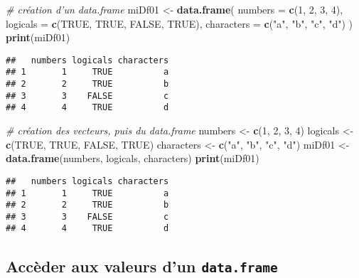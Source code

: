 \documentclass[]{book}
\newenvironment{Shaded}{\begin{snugshade}}{\end{snugshade}}
\newcommand{\KeywordTok}[1]{\textcolor[rgb]{0.13,0.29,0.53}{\textbf{#1}}}
\newcommand{\DataTypeTok}[1]{\textcolor[rgb]{0.13,0.29,0.53}{#1}}
\newcommand{\DecValTok}[1]{\textcolor[rgb]{0.00,0.00,0.81}{#1}}
\newcommand{\StringTok}[1]{\textcolor[rgb]{0.31,0.60,0.02}{#1}}
\newcommand{\CommentTok}[1]{\textcolor[rgb]{0.56,0.35,0.01}{\textit{#1}}}
\newcommand{\OtherTok}[1]{\textcolor[rgb]{0.56,0.35,0.01}{#1}}
\newcommand{\NormalTok}[1]{#1}
\theoremstyle{definition}
\theoremstyle{definition}
\theoremstyle{definition}
\theoremstyle{remark}
\begin{document}
\begin{Shaded}
\begin{Highlighting}[]
\CommentTok{# création d'un data.frame }
\NormalTok{miDf01 <-}\StringTok{ }\KeywordTok{data.frame}\NormalTok{(}
  \DataTypeTok{numbers =} \KeywordTok{c}\NormalTok{(}\DecValTok{1}\NormalTok{, }\DecValTok{2}\NormalTok{, }\DecValTok{3}\NormalTok{, }\DecValTok{4}\NormalTok{), }
  \DataTypeTok{logicals =} \KeywordTok{c}\NormalTok{(}\OtherTok{TRUE}\NormalTok{, }\OtherTok{TRUE}\NormalTok{, }\OtherTok{FALSE}\NormalTok{, }\OtherTok{TRUE}\NormalTok{), }
  \DataTypeTok{characters =} \KeywordTok{c}\NormalTok{(}\StringTok{"a"}\NormalTok{, }\StringTok{"b"}\NormalTok{, }\StringTok{"c"}\NormalTok{, }\StringTok{"d"}\NormalTok{)}
\NormalTok{)}
\KeywordTok{print}\NormalTok{(miDf01)}
\end{Highlighting}
\end{Shaded}

\begin{verbatim}
##   numbers logicals characters
## 1       1     TRUE          a
## 2       2     TRUE          b
## 3       3    FALSE          c
## 4       4     TRUE          d
\end{verbatim}

\begin{Shaded}
\begin{Highlighting}[]
\CommentTok{# création des vecteurs, puis du data.frame}
\NormalTok{numbers <-}\StringTok{ }\KeywordTok{c}\NormalTok{(}\DecValTok{1}\NormalTok{, }\DecValTok{2}\NormalTok{, }\DecValTok{3}\NormalTok{, }\DecValTok{4}\NormalTok{)}
\NormalTok{logicals <-}\StringTok{ }\KeywordTok{c}\NormalTok{(}\OtherTok{TRUE}\NormalTok{, }\OtherTok{TRUE}\NormalTok{, }\OtherTok{FALSE}\NormalTok{, }\OtherTok{TRUE}\NormalTok{)}
\NormalTok{characters <-}\StringTok{ }\KeywordTok{c}\NormalTok{(}\StringTok{"a"}\NormalTok{, }\StringTok{"b"}\NormalTok{, }\StringTok{"c"}\NormalTok{, }\StringTok{"d"}\NormalTok{)}
\NormalTok{miDf01 <-}\StringTok{ }\KeywordTok{data.frame}\NormalTok{(numbers, logicals, characters)}
\KeywordTok{print}\NormalTok{(miDf01)}
\end{Highlighting}
\end{Shaded}

\begin{verbatim}
##   numbers logicals characters
## 1       1     TRUE          a
## 2       2     TRUE          b
## 3       3    FALSE          c
## 4       4     TRUE          d
\end{verbatim}

\subsection{\texorpdfstring{Accèder aux valeurs d'un
\texttt{data.frame}}{Accèder aux valeurs d'un data.frame}}\label{acceder-aux-valeurs-dun-data.frame}
\end{document}
